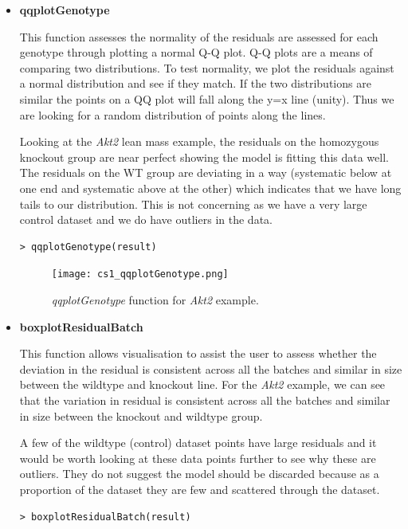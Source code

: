 \documentclass[12pt,a4paper]{article}
\begin{document}
\begin{itemize}
 \item \textbf{qqplotGenotype} 
 
This function assesses the normality of the residuals are assessed for each genotype through plotting a normal Q-Q plot. 
Q-Q plots are a means of comparing two distributions. To test normality, we plot the residuals against a normal distribution and see if they match. 
If the two distributions are similar the points on a QQ plot will fall along the y=x line (unity). Thus we are looking for a random distribution of points along the lines.  

Looking at the \textit{Akt2} lean mass example, the residuals on the homozygous knockout group are near perfect showing the model is fitting this data well.  
The residuals on the WT group are deviating in a way (systematic below at one end and systematic above at the other) which indicates that we have long tails to our distribution. 
This is not concerning as we have a very large control dataset and we do have outliers in the data.  

\begingroup
    \fontsize{8pt}{12pt}\selectfont
\begin{verbatim}
> qqplotGenotype(result)
\end{verbatim}
\endgroup 

\begin{figure}[H]%
\centerline{\texttt{[image: cs1\_qqplotGenotype.png]}}
\caption{\textit{qqplotGenotype} function for \textit{Akt2} example.}\label{fig:17}
\end{figure}

\item \textbf{boxplotResidualBatch} 

This function allows visualisation to assist the user to assess whether the deviation in the residual is consistent across all the batches and similar in size between the wildtype and knockout line. 
For the \textit{Akt2} example, we can see that the variation in residual is consistent across all the batches and similar in size between the knockout and wildtype group.

A few of the wildtype (control) dataset points have large residuals and it would be worth looking at these data points further to see why these are outliers. They do not suggest the model should be discarded because as a proportion of the dataset they are few and scattered through the dataset.

\begingroup
    \fontsize{8pt}{12pt}\selectfont
\begin{verbatim}
> boxplotResidualBatch(result)
\end{verbatim}
\endgroup 


\end{itemize}
\end{document}
